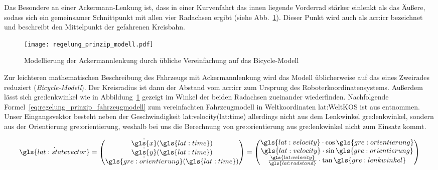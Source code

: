 Das Besondere an einer Ackermann-Lenkung ist, dass in einer Kurvenfahrt das innen liegende Vorderrad stärker einlenkt als das Äußere, sodass sich ein gemeinsamer Schnittpunkt mit allen vier Radachsen ergibt (siehe Abb.~\ref{fig:regelung_prinzip_modell}). Dieser Punkt wird auch als \gls{acr:icr} bezeichnet und beschreibt den Mittelpunkt der gefahrenen Kreisbahn. 

\begin{figure}[H] %
  \centering
  \texttt{[image: regelung\_prinzip\_modell.pdf]}
  \caption{Modellierung der Ackermannlenkung durch übliche Vereinfachung auf das Bicycle-Modell}
  \label{fig:regelung_prinzip_modell}
\end{figure}

Zur leichteren mathematischen Beschreibung des Fahrzeugs mit Ackermannlenkung wird das Modell üblicherweise auf das eines Zweirades reduziert (\emph{Bicycle-Modell}). Der Kreisradius ist dann der Abstand vom \gls{acr:icr} zum Ursprung des Roboterkoordinatensystems. Außerdem lässt sich \gls{gre:lenkwinkel} wie in Abbildung~\ref{fig:regelung_prinzip_modell} gezeigt im Winkel der beiden Radachsen zueinander wiederfinden. Nachfolgende Formel~\ref{eq:regelung_prinzip_fahrzeugmodell} zum vereinfachten Fahrzeugmodell in Weltkoordinaten \gls{lat:WeltKOS} ist aus \autocite{corkeRoboticsVisionControl2017} entnommen. Unser Eingangsvektor besteht neben der Geschwindigkeit \gls{lat:velocity}(\gls{lat:time}) allerdings nicht aus dem Lenkwinkel \gls{gre:lenkwinkel}, sondern aus der Orientierung \gls{gre:orientierung}, weshalb bei uns die Berechnung von \gls{gre:orientierung} aus \gls{gre:lenkwinkel} nicht zum Einsatz kommt. 

\begin{equation}
\dot{\gls{lat:statevector}} = 
\begin{pmatrix}
\dot{\gls{x}}(\gls{lat:time}) 	\\
\dot{\gls{y}}(\gls{lat:time})	\\
\dot{\gls{gre:orientierung}}(\gls{lat:time})    	\\
\end{pmatrix}
=
\begin{pmatrix}
\gls{lat:velocity} \cdot \cos \gls{gre:orientierung} 	\\
\gls{lat:velocity} \cdot \sin \gls{gre:orientierung} 	\\
\frac{\gls{lat:velocity}}{\gls{lat:radstand}} \cdot \tan \gls{gre:lenkwinkel}    	\\
\end{pmatrix}
\label{eq:regelung_prinzip_fahrzeugmodell}
\end{equation} 

